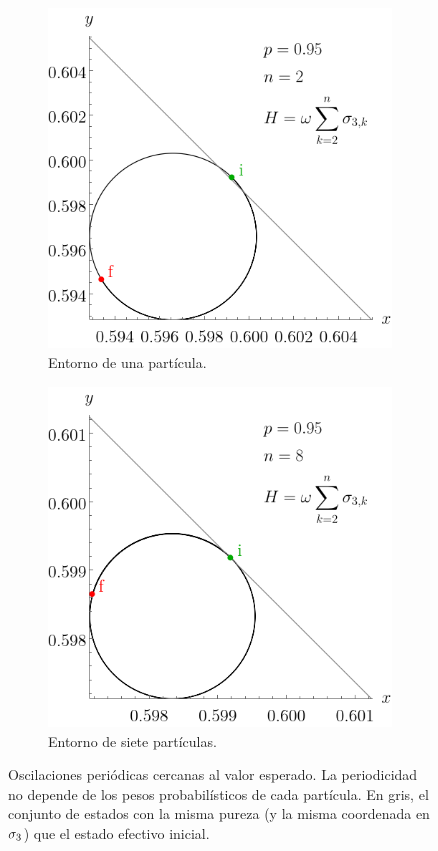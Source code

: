 \begin{figure}[ht!]
    \centering
    \begin{subfigure}{0.5\textwidth}
      \centering
      \includegraphics[width=0.9\linewidth]{chapter3/figures_separable/spheretraject_sameHam_difprob_n=2_p=0.95_both.png}
      \caption{Entorno de una partícula.}
    \end{subfigure}%
    \begin{subfigure}{0.5\textwidth}
      \centering
      \includegraphics[width=0.9\linewidth]{chapter3/figures_separable/spheretraject_sameHam_difprob_n=8_p=0.95_both.png}
      \caption{Entorno de siete partículas.}
    \end{subfigure}
    \caption{Oscilaciones periódicas cercanas al valor esperado. La periodicidad no depende de los pesos probabilísticos de cada partícula. En gris, el conjunto de estados con la misma pureza (y la misma coordenada en $\sigma_{3}$) que el estado efectivo inicial.}\label{fig:OscilationsSameHam}
\end{figure}

